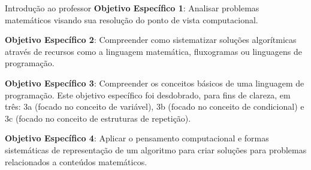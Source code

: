\begin{apresentacao}{Introdução ao professor}
\textbf{Objetivo Específico 1}: Analisar problemas matemáticos visando sua resolução do ponto de vista computacional.

\textbf{Objetivo Específico 2}: Compreender como sistematizar soluções algorítmicas através de recursos como a linguagem matemática, fluxogramas ou linguagens de programação.

\textbf{Objetivo Específico 3}: Compreender os conceitos básicos de uma linguagem de programação. Este objetivo específico foi desdobrado, para fins de clareza, em três: 3a (focado no conceito de variável), 3b (focado no conceito de condicional) e 3c (focado no conceito de estruturas de repetição).

\textbf{Objetivo Específico 4}: Aplicar o pensamento computacional e formas sistemáticas de representação de um algoritmo para criar soluções para problemas relacionados a conteúdos matemáticos.
\end{apresentacao}

